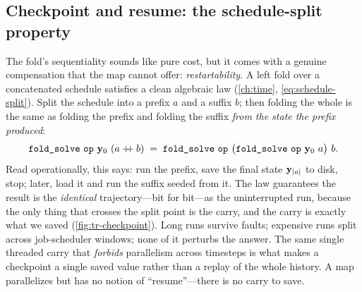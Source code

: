 \subsection{Checkpoint and resume: the schedule-split property}

The fold's sequentiality sounds like pure cost, but it comes with a genuine
compensation that the map cannot offer: \emph{restartability}. A left fold over a
concatenated schedule satisfies a clean algebraic law (\cref{ch:time},
\cref{eq:schedule-split}). Split the schedule into a prefix $a$ and a suffix $b$;
then folding the whole is the same as folding the prefix and folding the suffix
\emph{from the state the prefix produced}:
\begin{equation}
  \code{fold\_solve}\ \code{op}\ \vy_0\ (a \mathbin{+\!\!+} b)
  \;=\;
  \code{fold\_solve}\ \code{op}\ \bigl(\code{fold\_solve}\ \code{op}\ \vy_0\ a\bigr)\ b .
  \label{eq:tr-split}
\end{equation}
Read operationally, this says: run the prefix, save the final state $\mathbf{y}_{|a|}$ to
disk, stop; later, load it and run the suffix seeded from it. The law guarantees the
result is the \emph{identical} trajectory---bit for bit---as the uninterrupted run,
because the only thing that crosses the split point is the carry, and the carry is
exactly what we saved (\cref{fig:tr-checkpoint}). Long runs survive faults; expensive
runs split across job-scheduler windows; none of it perturbs the answer. The same
single threaded carry that \emph{forbids} parallelism across timesteps is what makes
a checkpoint a single saved value rather than a replay of the whole history. A map
parallelizes but has no notion of ``resume''---there is no carry to save.

